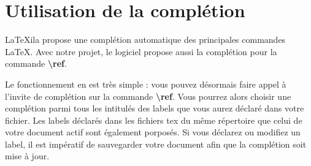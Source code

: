 \documentclass[a4paper,11pt]{report}
\begin{document}
\chapter{Utilisation de la complétion}

\LaTeX{}ila propose une complétion automatique des principales commandes \LaTeX{}. Avec notre projet, le logiciel propose aussi la complétion pour la commande \textbf{\textbackslash{}ref}.

Le fonctionnement en est très simple : vous pouvez désormais faire appel à l'invite de complétion sur la commande \textbf{\textbackslash{}ref}.
Vous pourrez alors choisir une complétion parmi tous les intitulés des labels que vous aurez déclaré dans votre fichier.
Les labels déclarés dans les fichiers tex du même répertoire que celui de votre document actif sont également porposés.
Si vous déclarez ou modifiez un label, il est impératif de sauvegarder votre document afin que la complétion soit mise à jour.
\end{document}
